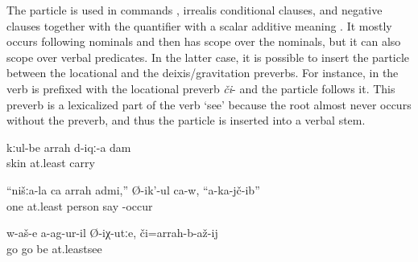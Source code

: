 The particle   is used in commands , irrealis conditional clauses, and negative clauses together with the quantifier   with a scalar additive meaning . It mostly occurs following nominals and then has scope over the nominals, but it can also scope over verbal predicates. In the latter case, it is possible to insert the particle between the locational and the deixis/gravitation preverbs. For instance, in  the verb is prefixed with the locational preverb \textit{či}- and the particle follows it. This preverb is a lexicalized part of the verb `see' because the root almost never occurs without the preverb, and thus the particle is inserted into a verbal stem.
%
\begin{exe}
	\ex	\label{ex:‎‎‎Give me at least the skin back minor}
	\gll	kːul-be	arrah	d-iqː-a	dam\\
		skin	at.least	carry	\\
	\glt	{}

	\ex	\label{ex:Of our (people) not even one man fell down, he says minor}
	\gll	``nišːa-la	ca	arrah	admi,''	Ø-ik'-ul	ca-w,	``a-ka-jč-ib''\\
			one	at.least	person	say		-occur\\
	\glt	{}

	\ex	\label{ex:Let's go if you did not go there, at least to see minor}
	\gll	w-aš-e	a-ag-ur-il	Ø-iχ-utːe,	či=arrah-b-až-ij\\
		go	go		be at.leastsee\\
	\glt	{}
\end{exe}

